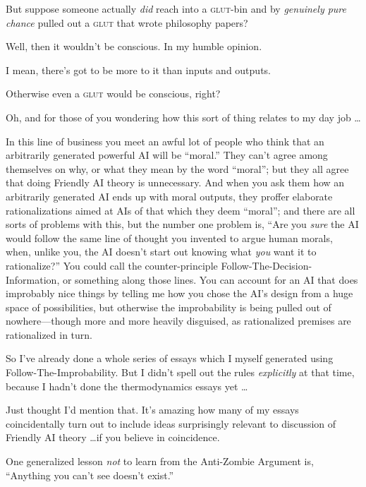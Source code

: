 {
 But suppose someone actually \textit{did} reach into a \textsc{glut}-bin
and by \textit{genuinely pure }\textit{chance} pulled out a \textsc{glut} that
wrote philosophy papers?}

{
 Well, then it wouldn't be conscious. In my humble
opinion.}

{
 I mean, there's got to be more to it than inputs
and outputs.}

{
 Otherwise even a \textsc{glut} would be conscious, right?}

{
 Oh, and for those of you wondering how this sort of thing relates
to my day job \ldots}

{
 In this line of business you meet an awful lot of people who think
that an arbitrarily generated powerful AI will be
``moral.'' They
can't agree among themselves on why, or what they mean
by the word ``moral''; but they all
agree that doing Friendly AI theory is unnecessary. And when you ask
them how an arbitrarily generated AI ends up with moral outputs, they
proffer elaborate rationalizations aimed at AIs of that which they deem
``moral''; and there are all sorts
of problems with this, but the number one problem is,
``Are you \textit{sure} the AI would follow the same
line of thought you invented to argue human morals, when, unlike you,
the AI doesn't start out knowing what \textit{you} want
it to rationalize?'' You could call the
counter-principle Follow-The-Decision-Information, or something along
those lines. You can account for an AI that does improbably nice things
by telling me how you chose the AI's design from a huge
space of possibilities, but otherwise the improbability is being pulled
out of nowhere---though more and more heavily disguised, as
rationalized premises are rationalized in turn.}

{
 So I've already done a whole series of essays
which I myself generated using Follow-The-Improbability. But I
didn't spell out the rules \textit{explicitly} at that
time, because I hadn't done the thermodynamics essays
yet \ldots}

{
 Just thought I'd mention that.
It's amazing how many of my essays coincidentally turn
out to include ideas surprisingly relevant to discussion of Friendly AI
theory \ldots if you believe in coincidence.}

\myendsectiontext


\bigskip


{
 One generalized lesson \textit{not} to learn from the Anti-Zombie
Argument is, ``Anything you can't see
doesn't exist.'' }

